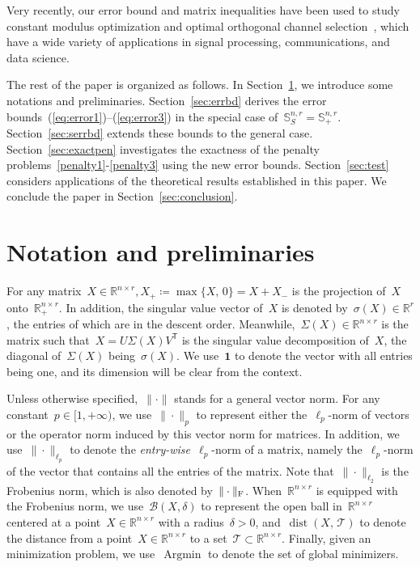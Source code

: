 \documentclass[11pt,a4paper]{article}  %
\theoremstyle{definition}
\DeclareMathOperator*{\Argmin}{Argmin}
\DeclareMathOperator{\dist}{dist}
\newcommand{\RR}{\mathbb{R}}
\newcommand{\BB}{\mathcal{B}}
\newcommand{\TT}{\mathcal{T}}
\newcommand{\col}{r}
\newcommand{\stf}[1]{\mathbb{S}^{#1}}
\newcommand{\fro}{{\scriptstyle{\textnormal{F}}}}
\newcommand{\trs}{{\scriptstyle{\mathsf{T}}}}
\newcommand{\tsign}{{\scriptscriptstyle{S}}}
\newcommand{\ones}{\mathbf{1}}
\begin{document}
Very recently, our error bound and matrix inequalities have been used to study constant modulus
optimization and optimal orthogonal channel selection~\cite{Channel,Anthony1, Anthony2}, which have a wide variety of applications in signal processing, communications, and data science.






The rest of the paper is organized as follows.
In Section~\ref{sec:lemmas}, we introduce some notations and preliminaries.
Section~\ref{sec:errbd} derives the error bounds~(\ref{eq:error1})--(\ref{eq:error3}) in the special
case of~$\stf{n,\col}_\tsign\!= \stf{n,\col}_+$.
Section~\ref{sec:serrbd} extends these bounds to the general case.
Section~\ref{sec:exactpen} investigates the exactness of the penalty problems~\eqref{penalty1}-\eqref{penalty3} using the new error bounds. Section~\ref{sec:test} considers applications of the theoretical results established in this paper.
We conclude the paper in Section~\ref{sec:conclusion}.%



\section{Notation and preliminaries}
\label{sec:lemmas}

For any matrix~$X\in\RR^{n\times \col}, X_+\coloneqq \max\{X, \, 0\}= X + X_{-}$ is
the projection of~$X$ onto~$\RR^{n\times \col}_+$. In addition,
the singular value vector of~$X$ is denoted by~$\sigma(X)\in\RR^{\col}$,
the entries of which are in the descent order.
Meanwhile,~$\Sigma(X)\in\RR^{n\times \col}$ is the matrix such
that~$X = U\Sigma(X)V^\trs$ is the singular value decomposition of~$X$, the diagonal
of~$\Sigma(X)$ being~$\sigma(X)$.
We use~$\ones$ to denote the vector with all entries being one, and its dimension will be clear from
the context.


Unless otherwise specified,~$\|\cdot\|$ stands for a general vector norm.
For any constant~$p \in [1, +\infty)$, we use~$\|\cdot\|_p$ to represent either
the~$\ell_p$-norm of vectors or the operator norm induced by this vector norm for matrices.
In addition, we use~$\|\cdot\|_{\ell_p}$ to denote the
\emph{entry-wise}~$\ell_p$-norm of a matrix, namely the~$\ell_p$-norm of the vector that contains
all the entries of the matrix. Note
that~$\|\cdot\|_{\ell_2}$ is the Frobenius norm, which is also denoted by~$\|\cdot\|_\fro$.
When~$\RR^{n\times \col}$ is equipped with the Frobenius norm,
we use~$\BB(X,\delta)$ to represent the open ball in~$\RR^{n\times\col}$
centered at a point~$X \in \RR^{n\times \col}$ with a radius~$\delta>0$,
and~$\dist(X,\, \TT)$ to denote the distance from a point~$X\in \RR^{n\times \col}$
to a set~$\TT\subset\RR^{n\times\col}$.
Finally, given an minimization problem, we use~$\Argmin$ to denote the set of global minimizers.
\end{document}
